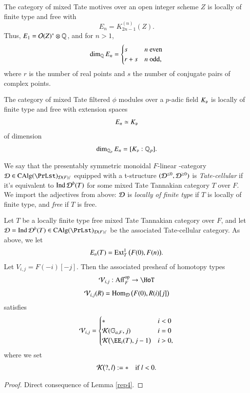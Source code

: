 \begin{ssExamples}
\label{LA55}
The category of mixed Tate motives over an open integer scheme $Z$ is locally of finite type and free with 
\[
E_n = K_{2n-1}^{(n)}(Z).
\]
Thus, $E_1 = \mathcal{O}(Z)^\ast \otimes \mathbb{Q}$, and for $n>1$, 
\[
\dim_{\mathbb{Q}} E_n = 
\begin{cases}
s & n \text{ even} \\
r+s & n \text{ odd},
\end{cases}
\]
where $r$ is the number of real points and $s$ the number of conjugate pairs of complex points. 


The category of mixed Tate filtered $\phi$ modules over a $p$-adic field $K_{\mathfrak{p}}$ is locally of finite type and free with extension spaces 
\[
E_n \simeq K_{\mathfrak{p}}
\]
of dimension 
\[
\dim_{{\mathbb{Q}_p}} E_n = [K_{\mathfrak{p}}: {\mathbb{Q}_p}].
\]
\end{ssExamples}

\begin{ssDefinition}
\label{LA57}
We say that the presentably symmetric monoidal $F$-linear \oo-category $\Dd \in \CAlg(\PrLst)_{\Dd(F)/}$ equipped with a t-structure $(\mathcal{D}^{\le 0}, \mathcal{D}^{\ge 0})$ is \emph{Tate-cellular} if it's equivalent to $\operatorname{Ind} \mathcal{D}^b(T)$ for some mixed Tate Tannakian category $T$ over $F$. We import the adjectives from above: $\mathcal{D}$ is \emph{locally of finite type} if $T$ is locally of finite type, and \emph{free} if $T$ is free.
\end{ssDefinition}

\begin{ssProposition}
\label{KG50}
Let $T$ be a locally finite type free mixed Tate Tannakian category over $F$, and let $\Dd = \Ind \Dd^b(T)  \in \CAlg (\PrLst)_{\Dd(F)/}$ be the associated Tate-cellular category. As above, we let 
\[
E_n(T) = \operatorname{Ext}^1_T \big( F(0), F(n) \big).
\]
Let $V_{i,j} = F(-i)[-j]$. Then  the associated presheaf of homotopy types 
\[
\Vv_{i,j}: \opnm{Aff}_F\op \to \HoT
\]
\[
\mathcal{V}_{i,j}(R) = \operatorname{Hom}_{\mathcal{D}} \big( F(0), R(i)[j] \big)
\]
satisfies
\[
\Vv_{i,j} = 
\begin{cases}
\ast & i < 0 \\
\Kk ( \GG_{a,F}, j) & i = 0 \\
\Kk \big( \EE_i(T), j-1 \big) & i >0,
\end{cases}
\]
where we set
\[
\mathcal{K} \big( ?, l \big) := \ast 
\quad \text{if } l<0.
\]
\end{ssProposition}

\begin{proof}
Direct consequence of Lemma \ref{rep4}.
\end{proof}




